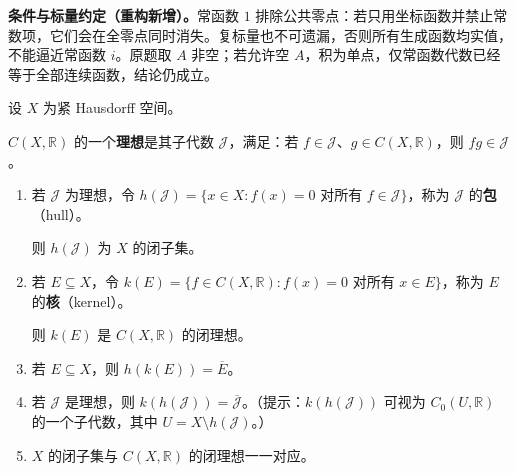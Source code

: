 \documentclass[../../main.tex]{subfiles}%
\begin{document}
\begin{remark}
\textbf{条件与标量约定（重构新增）。}常函数 $1$ 排除公共零点：若只用坐标函数并禁止常数项，它们会在全零点同时消失。复标量也不可遗漏，否则所有生成函数均实值，不能逼近常函数 $i$。原题取 $A$ 非空；若允许空 $A$，积为单点，仅常函数代数已经等于全部连续函数，结论仍成立。
\end{remark}
\begin{exercise}\label{exercise:ch04-ideals-hulls-kernels}
设 $X$ 为紧 Hausdorff 空间。
\begin{definition*}[连续函数代数的理想]\label{definition:ch04-function-ideal}
$C(X,\mathbb R)$ 的一个\textbf{理想}是其子代数 $\mathcal J$，满足：若 $f\in\mathcal J$、$g\in C(X,\mathbb R)$，则 $fg\in\mathcal J$。
\end{definition*}
\begin{enumerate}
\item\label{item:ch04-ideal-hull-closed}
\begin{definition*}[理想的包]\label{definition:ch04-ideal-hull}
若 $\mathcal J$ 为理想，令 $h(\mathcal J)=\{x\in X:f(x)=0\text{ 对所有 }f\in\mathcal J\}$，称为 $\mathcal J$ 的\textbf{包}（hull）。
\end{definition*}
则 $h(\mathcal J)$ 为 $X$ 的闭子集。
\item\label{item:ch04-set-kernel-closed}
\begin{definition*}[集合的核]\label{definition:ch04-set-kernel}
若 $E\subseteq X$，令 $k(E)=\{f\in C(X,\mathbb R):f(x)=0\text{ 对所有 }x\in E\}$，称为 $E$ 的\textbf{核}（kernel）。
\end{definition*}
则 $k(E)$ 是 $C(X,\mathbb R)$ 的闭理想。
\item\label{item:ch04-hull-kernel-set} 若 $E\subseteq X$，则 $h(k(E))=\overline E$。
\item\label{item:ch04-kernel-hull-ideal} 若 $\mathcal J$ 是理想，则 $k(h(\mathcal J))=\overline{\mathcal J}$。（提示：$k(h(\mathcal J))$ 可视为 $C_0(U,\mathbb R)$ 的一个子代数，其中 $U=X\setminus h(\mathcal J)$。）
\item\label{item:ch04-closed-ideal-correspondence} $X$ 的闭子集与 $C(X,\mathbb R)$ 的闭理想一一对应。
\end{enumerate}
\end{exercise}
\end{document}
